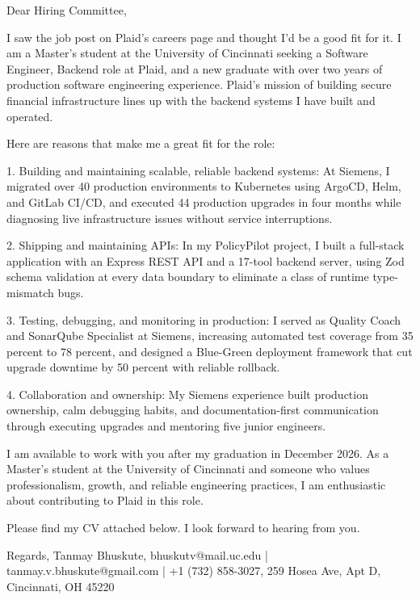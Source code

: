\documentclass[11pt, letterpaper]{article}
\begin{document}
Dear Hiring Committee,

I saw the job post on Plaid's careers page and thought I'd be a good fit for it. I am a Master's student at the University of Cincinnati seeking a Software Engineer, Backend role at Plaid, and a new graduate with over two years of production software engineering experience. Plaid's mission of building secure financial infrastructure lines up with the backend systems I have built and operated.

Here are reasons that make me a great fit for the role:

1. Building and maintaining scalable, reliable backend systems: At Siemens, I migrated over 40 production environments to Kubernetes using ArgoCD, Helm, and GitLab CI/CD, and executed 44 production upgrades in four months while diagnosing live infrastructure issues without service interruptions.

2. Shipping and maintaining APIs: In my PolicyPilot project, I built a full-stack application with an Express REST API and a 17-tool backend server, using Zod schema validation at every data boundary to eliminate a class of runtime type-mismatch bugs.

3. Testing, debugging, and monitoring in production: I served as Quality Coach and SonarQube Specialist at Siemens, increasing automated test coverage from 35 percent to 78 percent, and designed a Blue-Green deployment framework that cut upgrade downtime by 50 percent with reliable rollback.

4. Collaboration and ownership: My Siemens experience built production ownership, calm debugging habits, and documentation-first communication through executing upgrades and mentoring five junior engineers.

I am available to work with you after my graduation in December 2026. As a Master's student at the University of Cincinnati and someone who values professionalism, growth, and reliable engineering practices, I am enthusiastic about contributing to Plaid in this role.

Please find my CV attached below. I look forward to hearing from you.

Regards,
Tanmay Bhuskute,
bhuskutv@mail.uc.edu | tanmay.v.bhuskute@gmail.com | +1 (732) 858-3027,
259 Hosea Ave, Apt D, Cincinnati, OH 45220
\end{document}
